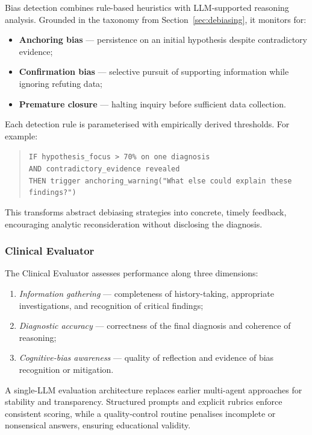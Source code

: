 Bias detection combines rule-based heuristics with LLM-supported reasoning
analysis.  
Grounded in the taxonomy from Section~\ref{sec:debiasing}, it monitors for:

\begin{itemize}
  \item \textbf{Anchoring bias} — persistence on an initial hypothesis despite
  contradictory evidence;
  \item \textbf{Confirmation bias} — selective pursuit of supporting information
  while ignoring refuting data;
  \item \textbf{Premature closure} — halting inquiry before sufficient data
  collection.
\end{itemize}

Each detection rule is parameterised with empirically derived thresholds.
For example:

\begin{quote}
\texttt{IF hypothesis\_focus > 70\% on one diagnosis}\\
\texttt{AND contradictory\_evidence revealed}\\
\texttt{THEN trigger anchoring\_warning("What else could explain these findings?")}
\end{quote}

This transforms abstract debiasing strategies into concrete, timely feedback,
encouraging analytic reconsideration without disclosing the diagnosis.

\subsubsection{Clinical Evaluator}

The Clinical Evaluator assesses performance along three dimensions:

\begin{enumerate}
  \item \textit{Information gathering} — completeness of history-taking,
  appropriate investigations, and recognition of critical findings;
  \item \textit{Diagnostic accuracy} — correctness of the final diagnosis and
  coherence of reasoning;
  \item \textit{Cognitive-bias awareness} — quality of reflection and evidence
  of bias recognition or mitigation.
\end{enumerate}

A single-LLM evaluation architecture replaces earlier multi-agent approaches for
stability and transparency.
Structured prompts and explicit rubrics enforce consistent scoring, while a
quality-control routine penalises incomplete or nonsensical answers, ensuring
educational validity.

